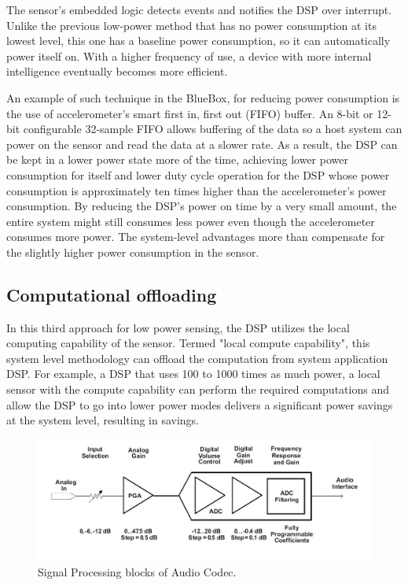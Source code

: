  The sensor's embedded logic detects events and notifies the DSP over interrupt. Unlike the previous low-power method that has no power consumption at its lowest level, this one has a baseline power consumption, so it can automatically power itself on. With a higher frequency of use, a device with more internal intelligence eventually becomes more efficient. 
 
An example of such technique in the BlueBox, for reducing power consumption is the use of accelerometer’s smart first in, first out (FIFO) buffer. An 8-bit or 12-bit configurable 32-sample FIFO allows buffering of the data so a host system can power on the sensor and read the data at a slower rate. As a result, the DSP can be kept in a lower power state more of 
 the time, achieving lower power consumption for itself and lower duty cycle operation for the DSP whose power consumption is approximately ten times higher than the accelerometer’s power consumption. By reducing the DSP’s power on time by a very small amount, the entire system might still consumes less power even though the accelerometer consumes more power. The system-level advantages more than compensate for the slightly 
 higher power consumption in the sensor. 
 
 \subsection{Computational offloading}
 In this third approach for low power sensing, the DSP utilizes the local computing capability of the sensor. Termed "local compute capability", this system level methodology can offload the computation from system application DSP. For example, a DSP that uses 100 to 1000 times as much power, a local sensor with the compute capability can perform the required computations and allow the DSP to go into lower power modes delivers a significant power savings at the system level, resulting in savings.  
 
  \begin{figure}[h]
 	\centering
 	\includegraphics[scale = 0.5 ]{AIC_processingBlock.JPG}
 	\caption{Signal Processing blocks of Audio Codec. \cite{audiocodec} \label{AIC_processingBlock}}
 \end{figure}
 

